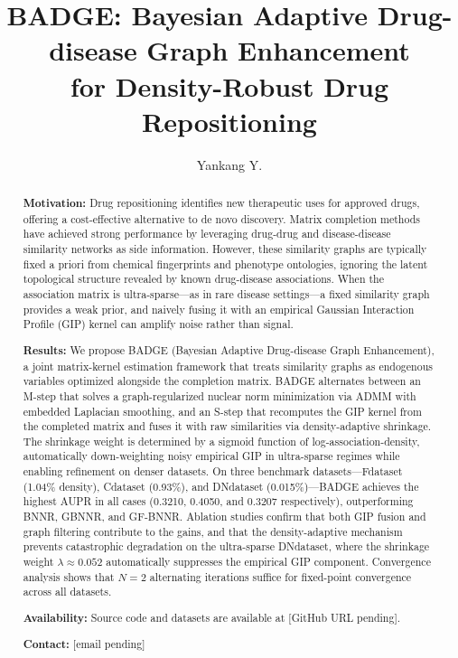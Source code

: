 \documentclass{oup-authoring-template}
\begin{document}
\title{BADGE: Bayesian Adaptive Drug-disease Graph Enhancement\\for Density-Robust Drug Repositioning}

\author{Yankang Y.}

\date{}

\maketitle

\begin{abstract}
\textbf{Motivation:} Drug repositioning identifies new therapeutic uses for approved drugs, offering a cost-effective alternative to de novo discovery. Matrix completion methods have achieved strong performance by leveraging drug-drug and disease-disease similarity networks as side information. However, these similarity graphs are typically fixed a priori from chemical fingerprints and phenotype ontologies, ignoring the latent topological structure revealed by known drug-disease associations. When the association matrix is ultra-sparse---as in rare disease settings---a fixed similarity graph provides a weak prior, and naively fusing it with an empirical Gaussian Interaction Profile (GIP) kernel can amplify noise rather than signal.

\textbf{Results:} We propose BADGE (Bayesian Adaptive Drug-disease Graph Enhancement), a joint matrix-kernel estimation framework that treats similarity graphs as endogenous variables optimized alongside the completion matrix. BADGE alternates between an M-step that solves a graph-regularized nuclear norm minimization via ADMM with embedded Laplacian smoothing, and an S-step that recomputes the GIP kernel from the completed matrix and fuses it with raw similarities via density-adaptive shrinkage. The shrinkage weight is determined by a sigmoid function of log-association-density, automatically down-weighting noisy empirical GIP in ultra-sparse regimes while enabling refinement on denser datasets. On three benchmark datasets---Fdataset (1.04\% density), Cdataset (0.93\%), and DNdataset (0.015\%)---BADGE achieves the highest AUPR in all cases (0.3210, 0.4050, and 0.3207 respectively), outperforming BNNR, GBNNR, and GF-BNNR. Ablation studies confirm that both GIP fusion and graph filtering contribute to the gains, and that the density-adaptive mechanism prevents catastrophic degradation on the ultra-sparse DNdataset, where the shrinkage weight $\lambda \approx 0.052$ automatically suppresses the empirical GIP component. Convergence analysis shows that $N=2$ alternating iterations suffice for fixed-point convergence across all datasets.

\textbf{Availability:} Source code and datasets are available at [GitHub URL pending].

\textbf{Contact:} [email pending]
\end{abstract}
\end{document}
